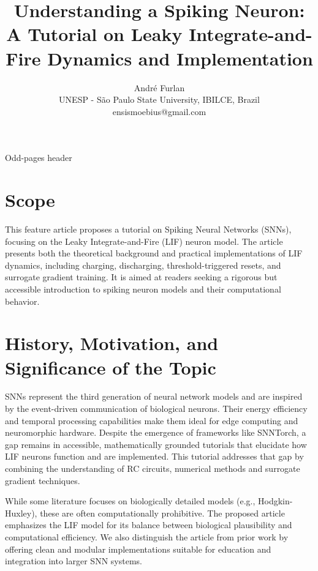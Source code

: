 \documentclass[journal,onecolumn]{IEEEtran}
\begin{document}
	\title{Understanding a Spiking Neuron: A Tutorial on Leaky Integrate-and-Fire Dynamics and Implementation}

	\author{André Furlan \\
	UNESP - São Paulo State University, IBILCE, Brazil \\
	{ensismoebius@gmail.com}}

	{Odd-pages header}
	
	\maketitle
	
	\section*{Scope}
		\par This feature article proposes a tutorial on Spiking Neural Networks (SNNs), focusing on the Leaky Integrate-and-Fire (LIF) neuron model. The article presents both the theoretical background and practical implementations of LIF dynamics, including charging, discharging, threshold-triggered resets, and surrogate gradient training. It is aimed at readers seeking a rigorous but accessible introduction to spiking neuron models and their computational behavior.\\
	
	\section{History, Motivation, and Significance of the Topic}
		\par SNNs represent the third generation of neural network models and are inspired by the event-driven communication of biological neurons. Their energy efficiency and temporal processing capabilities make them ideal for edge computing and neuromorphic hardware. Despite the emergence of frameworks like SNNTorch, a gap remains in accessible, mathematically grounded tutorials that elucidate how LIF neurons function and are implemented. This tutorial addresses that gap by combining the understanding of RC circuits, numerical methods and surrogate gradient techniques.
		
		\par While some literature focuses on biologically detailed models (e.g., Hodgkin-Huxley), these are often computationally prohibitive. The proposed article emphasizes the LIF model for its balance between biological plausibility and computational efficiency. We also distinguish the article from prior work by offering clean and modular implementations suitable for education and integration into larger SNN systems.
		
\end{document}
